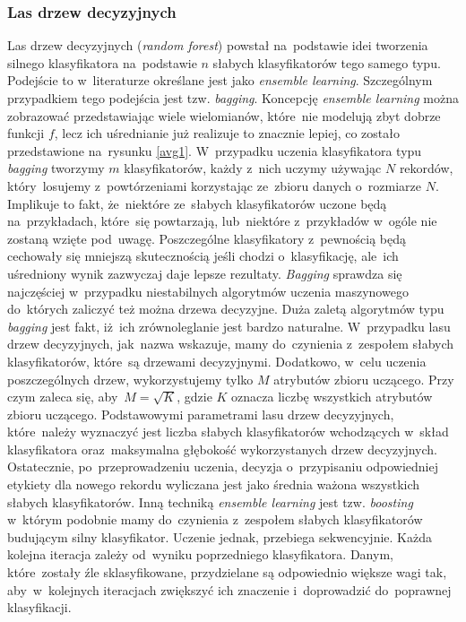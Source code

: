 \subsubsection{Las drzew decyzyjnych}
Las drzew decyzyjnych (\textit{random forest}) powstał na~podstawie idei tworzenia silnego klasyfikatora na~podstawie $n$ słabych klasyfikatorów tego samego typu. Podejście to w~literaturze określane jest jako \textit{ensemble learning}\cite{drucker1993improving}. Szczególnym przypadkiem tego podejścia jest tzw. \textit{bagging}\cite{gonczarek}. Koncepcję \textit{ensemble learning} można zobrazować przedstawiając wiele wielomianów, które~nie modelują zbyt dobrze funkcji $f$, lecz ich uśrednianie już realizuje to znacznie lepiej, co zostało przedstawione na~rysunku \ref{avg1}.  W~przypadku uczenia klasyfikatora typu \textit{bagging} tworzymy $m$ klasyfikatorów, każdy z~nich uczymy używając $N$ rekordów, który~losujemy z~powtórzeniami korzystając ze~zbioru danych o~rozmiarze $N$. Implikuje to fakt, że~niektóre ze~słabych klasyfikatorów uczone będą na~przykładach, które~się powtarzają, lub~niektóre z~przykładów w~ogóle nie zostaną wzięte pod~uwagę. Poszczególne klasyfikatory z~pewnością będą cechowały się mniejszą skutecznością jeśli chodzi o~klasyfikację, ale~ich uśredniony wynik zazwyczaj daje lepsze rezultaty. \textit{Bagging} sprawdza się najczęściej w~przypadku niestabilnych algorytmów uczenia maszynowego do~których zaliczyć też można drzewa decyzyjne\cite{ensemble}. Duża zaletą algorytmów typu \textit{bagging} jest fakt, iż~ich zrównoleglanie jest bardzo naturalne.
W~przypadku lasu drzew decyzyjnych, jak~nazwa wskazuje, mamy do~czynienia z~zespołem słabych klasyfikatorów, które~są drzewami decyzyjnymi. Dodatkowo, w~celu uczenia poszczególnych drzew, wykorzystujemy tylko $M$ atrybutów zbioru uczącego. Przy czym zaleca się, aby~$M=\sqrt{K}$, gdzie $K$ oznacza liczbę wszystkich atrybutów zbioru uczącego. Podstawowymi parametrami lasu drzew decyzyjnych, które~należy wyznaczyć jest liczba słabych klasyfikatorów wchodzących w~skład klasyfikatora oraz~maksymalna głębokość wykorzystanych drzew decyzyjnych. Ostatecznie, po~przeprowadzeniu uczenia, decyzja o~przypisaniu odpowiedniej etykiety dla nowego rekordu wyliczana jest jako średnia ważona wszystkich słabych klasyfikatorów. Inną techniką \textit{ensemble learning} jest tzw. \textit{boosting}\cite{drucker1996boosting} w~którym podobnie mamy do~czynienia z~zespołem słabych klasyfikatorów budującym silny klasyfikator. Uczenie jednak, przebiega sekwencyjnie. Każda kolejna iteracja zależy od~wyniku poprzedniego klasyfikatora. Danym, które~zostały źle sklasyfikowane, przydzielane są odpowiednio większe wagi tak, aby~w~kolejnych iteracjach zwiększyć ich znaczenie i~doprowadzić do~poprawnej klasyfikacji.

